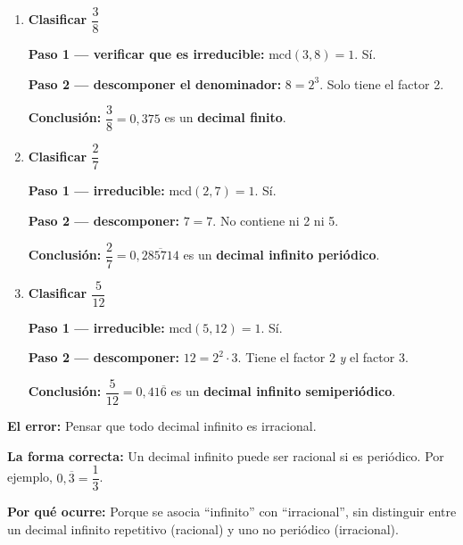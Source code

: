 \documentclass[11pt, letterpaper]{article}
\begin{document}
\begin{tcolorbox}[examplebox, title={Ejemplos --- Clasificar el tipo de decimal}]
\begin{enumerate}[label=\textbf{Ej. \arabic*.}, leftmargin=*, itemsep=14pt]

\item \textbf{Clasificar $\dfrac{3}{8}$}

\textbf{Paso 1 --- verificar que es irreducible:} $\text{mcd}(3,8)=1$. S\'i.

\medskip
\textbf{Paso 2 --- descomponer el denominador:} $8=2^3$. Solo tiene el factor 2.

\medskip
\textbf{Conclusi\'on:} $\dfrac{3}{8}=0{,}375$ es un \textbf{decimal finito}. \checkmark

\item \textbf{Clasificar $\dfrac{2}{7}$}

\textbf{Paso 1 --- irreducible:} $\text{mcd}(2,7)=1$. S\'i.

\medskip
\textbf{Paso 2 --- descomponer:} $7=7$. No contiene ni 2 ni 5.

\medskip
\textbf{Conclusi\'on:} $\dfrac{2}{7}=0{,}\overline{285714}$ es un \textbf{decimal infinito periódico}. \checkmark

\item \textbf{Clasificar $\dfrac{5}{12}$}

\textbf{Paso 1 --- irreducible:} $\text{mcd}(5,12)=1$. S\'i.

\medskip
\textbf{Paso 2 --- descomponer:} $12=2^2\cdot 3$. Tiene el factor 2 \textit{y} el factor 3.

\medskip
\textbf{Conclusi\'on:} $\dfrac{5}{12}=0{,}41\overline{6}$ es un \textbf{decimal infinito semiperiódico}. \checkmark

\end{enumerate}
\end{tcolorbox}

\begin{tcolorbox}[warningbox, title={Error frecuente --- Confundir decimal infinito con irracional}]
\noindent\textbf{El error:}
Pensar que todo decimal infinito es irracional.

\medskip
\noindent\textbf{La forma correcta:}
Un decimal infinito puede ser racional si es peri\'odico. Por ejemplo, $0{,}\overline{3}=\dfrac{1}{3}$.

\medskip
\noindent\textbf{Por qu\'e ocurre:}
Porque se asocia ``infinito'' con ``irracional'', sin distinguir entre un decimal infinito repetitivo (racional) y uno no peri\'odico (irracional).
\end{tcolorbox}
\end{document}
